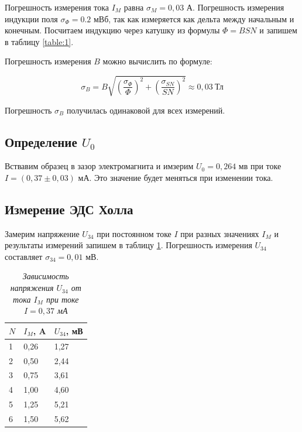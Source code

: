 \documentclass[a4paper,12pt]{article}
\begin{document}
Погрешность измерения тока $I_M$ равна $\sigma_M = 0,03$ А. Погрешность измерения индукции поля $\sigma_\Phi = 0.2$ мВб, так как измеряется как дельта между начальным и конечным. Посчитаем индукцию через катушку из формулы $\Phi = B SN$ и запишем в таблицу \ref{table:1}.

Погрешность измерения $B$ можно вычислить по формуле:

\begin{equation}
    \sigma_B = B \sqrt{\left( \frac{\sigma_\Phi}{\Phi} \right)^2 + \left( \frac{\sigma_{SN}}{SN} \right)^2} \approx 0,03 \ \text{Тл}
\end{equation}

Погрешность $\sigma_B$ получилась одинаковой для всех измерений.

\subsection{Определение $U_0$}

Вствавим образец в зазор электромагнита и имзерим $U_0 = 0,264$ мв при токе $I = (0,37 \pm 0,03)$ мА. Это значение будет меняться при изменении тока.

\subsection{Измерение ЭДС Холла}
\label{punkt:4.6}

Замерим напряжение $U_{34}$ при постоянном токе $I$ при разных значениях $I_M$ и результаты измерений запишем в таблицу \ref{table:2}. Погрешность измерения $U_{34}$ составляет $\sigma_{34} = 0,01$ мВ.

\begin{table}[!ht]
    \centering
    \begin{tabular}{|l|l|l|}
    \hline
        $N$ & $I_M$, A & $U_{34}$, мВ \\ \hline
        1 & 0,26 & 1,27 \\ \hline
        2 & 0,50 & 2,44 \\ \hline
        3 & 0,75 & 3,61 \\ \hline
        4 & 1,00 & 4,60 \\ \hline
        5 & 1,25 & 5,21 \\ \hline
        6 & 1,50 & 5,62 \\ \hline
    \end{tabular}\caption{\textit{Зависимость напряжения $U_{34}$ от тока $I_M$ при токе $I = 0,37$ мА}}\label{table:2}
\end{table}
\end{document}

